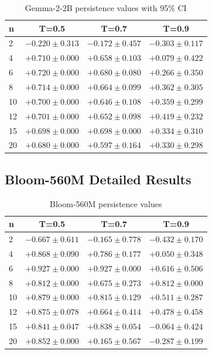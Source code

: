 \documentclass[12pt,a4paper]{article}
\begin{document}
\begin{table}[H]
\centering
\caption{Gemma-2-2B persistence values with 95\% CI}
\begin{tabular}{lccc}
\toprule
\textbf{n} & \textbf{T=0.5} & \textbf{T=0.7} & \textbf{T=0.9} \\
\midrule
2 & $-0.220 \pm 0.313$ & $-0.172 \pm 0.457$ & $-0.303 \pm 0.117$ \\
4 & $+0.710 \pm 0.000$ & $+0.658 \pm 0.103$ & $+0.079 \pm 0.422$ \\
6 & $+0.720 \pm 0.000$ & $+0.680 \pm 0.080$ & $+0.266 \pm 0.350$ \\
8 & $+0.714 \pm 0.000$ & $+0.664 \pm 0.099$ & $+0.362 \pm 0.305$ \\
10 & $+0.700 \pm 0.000$ & $+0.646 \pm 0.108$ & $+0.359 \pm 0.299$ \\
12 & $+0.701 \pm 0.000$ & $+0.652 \pm 0.098$ & $+0.419 \pm 0.232$ \\
15 & $+0.698 \pm 0.000$ & $+0.698 \pm 0.000$ & $+0.334 \pm 0.310$ \\
20 & $+0.680 \pm 0.000$ & $+0.597 \pm 0.164$ & $+0.330 \pm 0.298$ \\
\bottomrule
\end{tabular}
\end{table}

\subsection{Bloom-560M Detailed Results}

\begin{table}[H]
\centering
\caption{Bloom-560M persistence values}
\begin{tabular}{lccc}
\toprule
\textbf{n} & \textbf{T=0.5} & \textbf{T=0.7} & \textbf{T=0.9} \\
\midrule
2 & $-0.667 \pm 0.611$ & $-0.165 \pm 0.778$ & $-0.432 \pm 0.170$ \\
4 & $+0.868 \pm 0.090$ & $+0.786 \pm 0.177$ & $+0.050 \pm 0.348$ \\
6 & $+0.927 \pm 0.000$ & $+0.927 \pm 0.000$ & $+0.616 \pm 0.506$ \\
8 & $+0.812 \pm 0.000$ & $+0.675 \pm 0.273$ & $+0.812 \pm 0.000$ \\
10 & $+0.879 \pm 0.000$ & $+0.815 \pm 0.129$ & $+0.511 \pm 0.287$ \\
12 & $+0.875 \pm 0.078$ & $+0.664 \pm 0.414$ & $+0.478 \pm 0.458$ \\
15 & $+0.841 \pm 0.047$ & $+0.838 \pm 0.054$ & $-0.064 \pm 0.424$ \\
20 & $+0.852 \pm 0.000$ & $+0.165 \pm 0.567$ & $-0.287 \pm 0.199$ \\
\bottomrule
\end{tabular}
\end{table}
\end{document}
